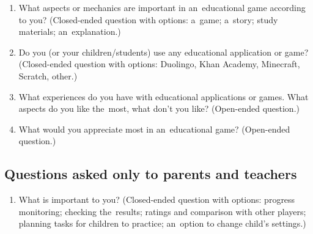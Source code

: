 \begin{enumerate}
    \item What aspects or mechanics are important in an~educational game according to you? (Closed-ended question with options: a~game; a~story; study materials; an~explanation.)
    \item Do you (or your children/students) use any educational application or game? (Closed-ended question with options: Duolingo, Khan Academy, Minecraft, Scratch, other.)
    \item What experiences do you have with educational applications or games. What aspects do you like the~most, what don't you like? (Open-ended question.)
    \item What would you appreciate most in an~educational game? (Open-ended question.) 
\end{enumerate}

\subsection*{Questions asked only to parents and teachers}

\begin{enumerate}
    \item What is important to you? (Closed-ended question with options: progress monitoring; checking the~results; ratings and comparison with other players; planning tasks for children to practice; an~option to change child's settings.) 
\end{enumerate}

